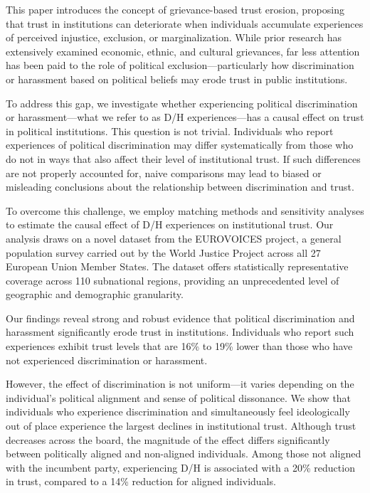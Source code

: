 \documentclass{article}
\begin{document}
This paper introduces the concept of grievance-based trust erosion, proposing that trust in institutions can deteriorate when individuals accumulate experiences of perceived injustice, exclusion, or marginalization. While prior research has extensively examined economic, ethnic, and cultural grievances, far less attention has been paid to the role of political exclusion—particularly how discrimination or harassment based on political beliefs may erode trust in public institutions.

To address this gap, we investigate whether experiencing political discrimination or harassment—what we refer to as D/H experiences—has a causal effect on trust in political institutions. This question is not trivial. Individuals who report experiences of political discrimination may differ systematically from those who do not in ways that also affect their level of institutional trust. If such differences are not properly accounted for, naive comparisons may lead to biased or misleading conclusions about the relationship between discrimination and trust.

To overcome this challenge, we employ matching methods and sensitivity analyses to estimate the causal effect of D/H experiences on institutional trust. Our analysis draws on a novel dataset from the EUROVOICES project, a general population survey carried out by the World Justice Project across all 27 European Union Member States. The dataset offers statistically representative coverage across 110 subnational regions, providing an unprecedented level of geographic and demographic granularity.

Our findings reveal strong and robust evidence that political discrimination and harassment significantly erode trust in institutions. Individuals who report such experiences exhibit trust levels that are 16\% to 19\% lower than those who have not experienced discrimination or harassment.

However, the effect of discrimination is not uniform—it varies depending on the individual's political alignment and sense of political dissonance. We show that individuals who experience discrimination and simultaneously feel ideologically out of place experience the largest declines in institutional trust. Although trust decreases across the board, the magnitude of the effect differs significantly between politically aligned and non-aligned individuals. Among those not aligned with the incumbent party, experiencing D/H is associated with a 20\% reduction in trust, compared to a 14\% reduction for aligned individuals.
\end{document}
